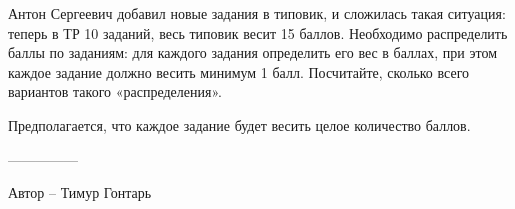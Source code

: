 \question
Антон Сергеевич добавил новые задания в типовик, и сложилась такая ситуация: теперь в ТР 10 заданий, весь типовик весит 15 баллов. Необходимо распределить баллы по заданиям: для каждого задания определить его вес в баллах, при этом каждое задание должно весить минимум 1 балл. Посчитайте, сколько всего вариантов такого «распределения».

Предполагается, что каждое задание будет весить целое количество баллов.

---------------

Автор -- Тимур Гонтарь
